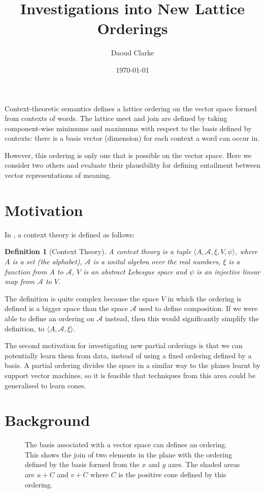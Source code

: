 \documentclass{article}
\author{Daoud Clarke}
\date{\today}
\title{Investigations into New Lattice Orderings}
\newtheorem{definition}{Definition}
\begin{document}
\maketitle

Context-theoretic semantics \citep{Clarke:07} defines a lattice
ordering on the vector space formed from contexts of words. The
lattice meet and join are defined by taking component-wise minimums
and maximums with respect to the basis defined by contexts: there is a
basis vector (dimension) for each context a word can occur in.

However, this ordering is only one that is possible on the vector
space. Here we consider two others and evaluate their plausibility for
defining entailment between vector representations of meaning.

\section{Motivation}

In \citep{Clarke:12}, a context theory is defined as follows:
\begin{definition}[Context Theory]
A context theory is a tuple $\langle A, \mathcal{A}, \xi, V, \psi
\rangle$, where $A$ is a set (the alphabet), $\mathcal{A}$ is a unital
algebra over the real numbers, $\xi$ is a function from $A$ to
$\mathcal{A}$, $V$ is an abstract Lebesgue space and $\psi$ is an
injective linear map from $\mathcal{A}$ to $V$.
\end{definition}

The definition is quite complex because the space $V$ in which the
ordering is defined is a bigger space than the space $\mathcal{A}$
used to define composition. If we were able to define an ordering on
$\mathcal{A}$ instead, then this would significantly simplify the
definition, to $\langle A, \mathcal{A}, \xi\rangle$.

The second motivation for investigating new partial orderings is that
we can potentially learn them from data, instead of using a fixed
ordering defined by a basis. A partial ordering divides the space in a
similar way to the planes learnt by support vector machines, so it is
feasible that techniques from this area could be generalised to learn
cones.

\section{Background}

\begin{figure}
\begin{center}

\caption{The basis associated with a vector space can defines an
  ordering. This shows the join of two elements in the plane with the
  ordering defined by the basis formed from the $x$ and $y$ axes. The
  shaded areas are $u + C$ and $v + C$ where $C$ is the positive
  cone defined by this ordering. }
\end{center}
\end{figure}
\end{document}
